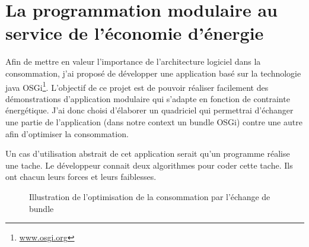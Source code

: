 \documentclass[a4paper, 11pt]{report}
\begin{document}
\chapter{La programmation modulaire au service de l'économie d'énergie}
Afin de mettre en valeur l'importance de l'architecture logiciel dans la consommation, j'ai proposé de développer une application basé sur la technologie java OSGi\footnote{\href{http://www.osgi.org}{www.osgi.org}}. L'objectif de ce projet est de pouvoir réaliser facilement des démonstrations d'application modulaire qui s'adapte en fonction de contrainte énergétique. J'ai donc choisi d'élaborer un quadriciel qui permettrai d'échanger une partie de l'application (dans notre context un bundle OSGi) contre une autre afin d'optimiser la consommation.

Un cas d'utilisation abstrait de cet application serait qu'un programme réalise une tache. Le développeur connait deux algorithmes pour coder cette tache. Ils ont chacun leurs forces et leurs faiblesses.

\begin{figure}[htp]
  \centering
  \caption{Illustration de l'optimisation de la consommation par l'échange de bundle}
  \label{AbsBdl}
\end{figure}
\end{document}
